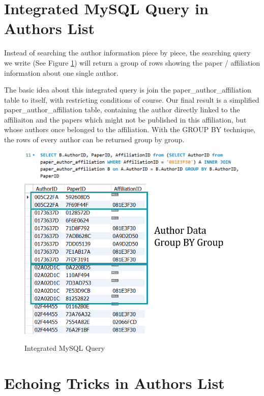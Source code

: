 \documentclass{book}
\begin{document}
\section {Integrated MySQL Query in Authors List}

Instead of searching the author information piece by piece, the searching query we write (See Figure \ref{fig:opt_query}) will return a group of rows showing the paper / affiliation information about one single author.

The basic idea about this integrated query is join the paper\_author\_affiliation table to itself, with restricting conditions of course. Our final result is a simplified paper\_author\_affiliation table, containing the author directly linked to the affiliaiton and the papers which might not be published in this affiliation, but whose authors once belonged to the affiliation. With the GROUP BY technique, the rows of every author can be returned group by group.

\begin{figure}[H]
\centering
\includegraphics[scale=0.55]{img/zlt_opt_code_query.png}
\includegraphics[scale=0.55]{img/zlt_opt_code_queryres.png}
\caption{Integrated MySQL Query}
\label{fig:opt_query}
\end{figure}

\section{Echoing Tricks in Authors List}
\end{document}
